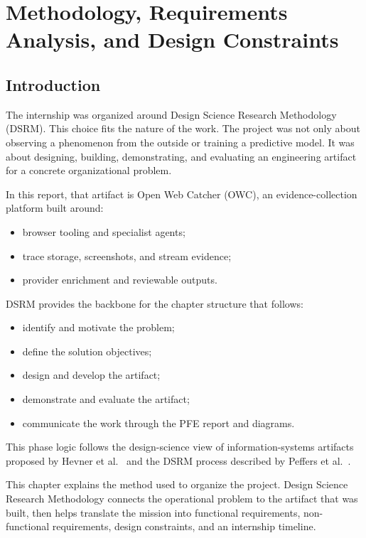 \chapter{Methodology, Requirements Analysis, and Design Constraints}\label{chap:methodology}

\section{Introduction}

The internship was organized around Design Science Research Methodology (DSRM). This
choice fits the nature of the work. The project was not only about observing a
phenomenon from the outside or training a predictive model. It was about designing, building,
demonstrating, and evaluating an engineering artifact for a concrete organizational
problem.

In this report, that artifact is Open Web Catcher (OWC), an evidence-collection
platform built around:
\begin{itemize}
  \item browser tooling and specialist agents;
  \item trace storage, screenshots, and stream evidence;
  \item provider enrichment and reviewable outputs.
\end{itemize}

DSRM provides the backbone for the chapter structure that follows:
\begin{itemize}
  \item identify and motivate the problem;
  \item define the solution objectives;
  \item design and develop the artifact;
  \item demonstrate and evaluate the artifact;
  \item communicate the work through the PFE report and diagrams.
\end{itemize}

This phase logic follows the design-science view of information-systems artifacts
proposed by Hevner et al.~\cite{hevner-ds} and the DSRM process described by Peffers
et al.~\cite{peffers-dsrm}.

This chapter explains the method used to organize the project. Design Science
Research Methodology connects the operational problem to the artifact that was
built, then helps translate the mission into functional requirements, non-functional
requirements, design constraints, and an internship timeline.

